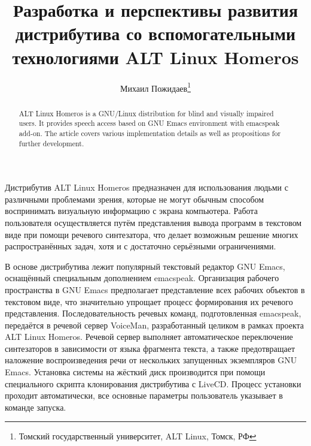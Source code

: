 \documentclass[10pt, a5paper]{article}
\begin{document}
\title{Разработка и перспективы развития дистрибутива со вспомогательными технологиями ALT Linux Homeros}%

\author{Михаил Пожидаев\footnote{ Томский государственный университет, ALT Linux, Томск, РФ}}
\maketitle

\begin{abstract}
ALT Linux Homeros is a GNU/Linux distribution for blind and visually impaired users. It provides speech access based on GNU Emacs environment with emacspeak add-on. The article covers various implementation details as well as propositions for further development.
\end{abstract}

Дистрибутив ALT Linux Homeros предназначен для использования людьми с различными проблемами зрения, которые не могут обычным способом воспринимать визуальную информацию с экрана компьютера. Работа пользователя осуществляется путём представления вывода программ в текстовом виде при помощи речевого синтезатора, что делает возможным решение многих распространённых задач, хотя и с достаточно серьёзными ограничениями.

В основе дистрибутива лежит популярный текстовый редактор GNU Emacs, оснащённый специальным дополнением emacspeak. Организация рабочего пространства в GNU Emacs предполагает представление всех рабочих объектов в текстовом виде, что значительно упрощает процесс формирования их речевого представления. Последовательность речевых команд, подготовленная emacspeak, передаётся в речевой сервер VoiceMan, разработанный целиком в рамках проекта ALT Linux Homeros. Речевой сервер выполняет автоматическое переключение синтезаторов в зависимости от языка фрагмента текста, а также предотвращает наложение воспроизведения речи от нескольких запущенных экземпляров GNU Emacs. Установка системы на жёсткий диск производится при помощи специального скрипта клонирования дистрибутива с LiveCD. Процесс установки проходит автоматически, все основные параметры пользователь указывает в команде запуска.
\end{document}
